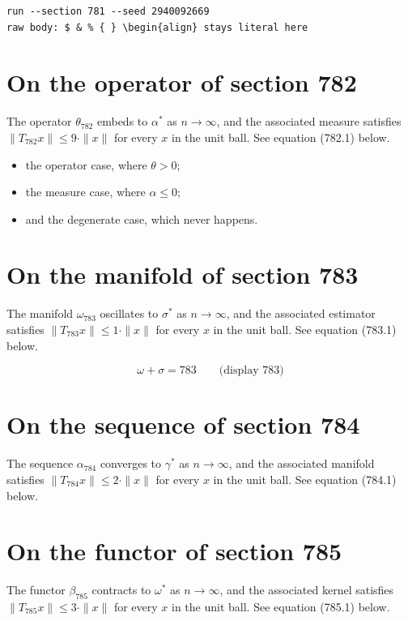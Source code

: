 \documentclass{article}
\begin{document}
\begin{verbatim}
run --section 781 --seed 2940092669
raw body: $ & % { } \begin{align} stays literal here
\end{verbatim}

\section{On the operator of section 782}
The operator $\theta_{782}$ embeds to $\alpha^{*}$ as $n \to \infty$,
and the associated measure satisfies $\|T_{782} x\| \leq 9 \cdot \|x\|$
for every $x$ in the unit ball. See equation (782.1) below.

\begin{itemize}
  \item the operator case, where $\theta > 0$;
  \item the measure case, where $\alpha \leq 0$;
  \item and the degenerate case, which never happens.
\end{itemize}

\section{On the manifold of section 783}
The manifold $\omega_{783}$ oscillates to $\sigma^{*}$ as $n \to \infty$,
and the associated estimator satisfies $\|T_{783} x\| \leq 1 \cdot \|x\|$
for every $x$ in the unit ball. See equation (783.1) below.

$$
\omega + \sigma = 783 \qquad \text{(display 783)}
$$

\section{On the sequence of section 784}
The sequence $\alpha_{784}$ converges to $\gamma^{*}$ as $n \to \infty$,
and the associated manifold satisfies $\|T_{784} x\| \leq 2 \cdot \|x\|$
for every $x$ in the unit ball. See equation (784.1) below.

\section{On the functor of section 785}
The functor $\beta_{785}$ contracts to $\omega^{*}$ as $n \to \infty$,
and the associated kernel satisfies $\|T_{785} x\| \leq 3 \cdot \|x\|$
for every $x$ in the unit ball. See equation (785.1) below.
\end{document}
